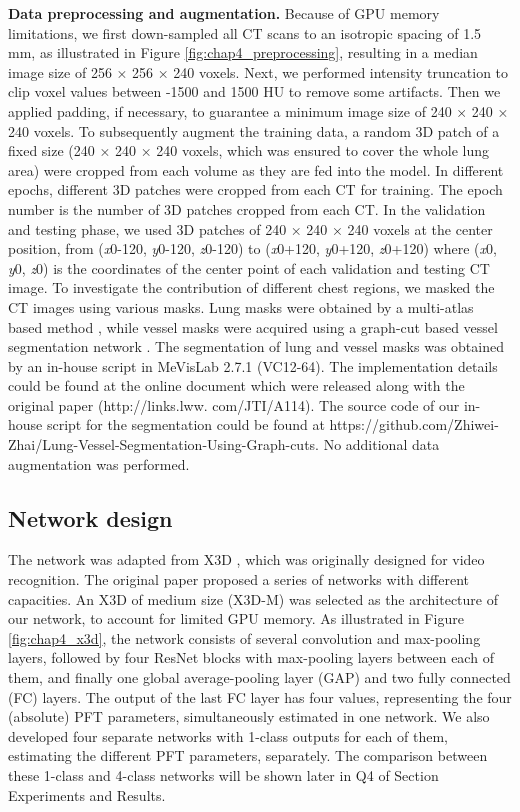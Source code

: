 \textbf{Data preprocessing and augmentation.} Because of GPU memory limitations, we first down-sampled all CT scans to an isotropic spacing of 1.5 mm, as illustrated in Figure \ref{fig:chap4_preprocessing}, resulting in a median image size of 256 × 256 × 240 voxels. Next, we performed intensity truncation to clip voxel values between -1500 and 1500 HU to remove some artifacts. Then we applied padding, if necessary, to guarantee a minimum image size of 240 × 240 × 240 voxels. To subsequently augment the training data, a random 3D patch of a fixed size (240 × 240 × 240 voxels, which was ensured to cover the whole lung area) were cropped from each volume as they are fed into the model. In different epochs, different 3D patches were cropped from each CT for training. The epoch number is the number of 3D patches cropped from each CT. In the validation and testing phase, we used 3D patches of 240 × 240 × 240 voxels at the center position, from (\textit{x}0-120, \textit{y}0-120, \textit{z}0-120) to (\textit{x}0+120, \textit{y}0+120, \textit{z}0+120) where (\textit{x}0, \textit{y}0, \textit{z}0) is the coordinates of the center point of each validation and testing CT image. To investigate the contribution of different chest regions, we masked the CT images using various masks. Lung masks were obtained by a multi-atlas based method \cite{Zhai2019}, while vessel masks were acquired using a graph-cut based vessel segmentation network \cite{zhai2016lung}. The segmentation of lung and vessel masks was obtained by an in-house script in MeVisLab 2.7.1 (VC12-64). The implementation details could be found at the online document which were released along with the original paper \cite{Zhai2016} (http://links.lww. com/JTI/A114). The source code of our in-house script for the segmentation could be found at https://github.com/Zhiwei-Zhai/Lung-Vessel-Segmentation-Using-Graph-cuts. No additional data augmentation was performed.


\subsection{Network design}
The network was adapted from X3D \cite{Feichtenhofer}, which was originally designed for video recognition. The original paper proposed a series of networks with different capacities. An X3D of medium size (X3D-M) was selected as the architecture of our network, to account for limited GPU memory. As illustrated in Figure \ref{fig:chap4_x3d}, the network consists of several convolution and max-pooling layers, followed by four ResNet blocks with max-pooling layers between each of them, and finally one global average-pooling layer (GAP) and two fully connected (FC) layers. The output of the last FC layer has four values, representing the four (absolute) PFT parameters, simultaneously estimated in one network. We also developed four separate networks with 1-class outputs for each of them, estimating the different PFT parameters, separately. The comparison between these 1-class and 4-class networks will be shown later in Q4 of Section Experiments and Results.

